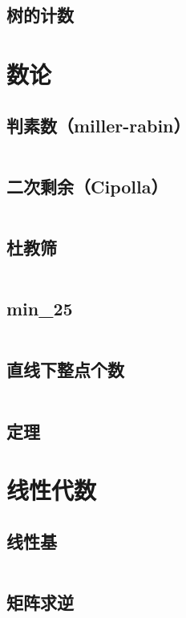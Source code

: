 \documentclass[a4paper,9]{article}
\begin{document}
\subsection{树的计数}


\section{数论}
\subsection{判素数（miller-rabin）}
\inputminted[breaklines]{c++}{number_theory/miller_rabin.cpp}
\subsection{二次剩余（Cipolla）}

\inputminted[breaklines]{c++}{number_theory/cipolla.cpp}
\subsection{杜教筛}
\inputminted[breaklines]{c++}{number_theory/dujiaoshai.cpp}
\subsection{min\_25}
\inputminted[breaklines]{c++}{number_theory/min25.cpp}
\subsection{直线下整点个数}
\inputminted[breaklines]{c++}{number_theory/lattice_count.cpp}
\subsection{定理}


\section{线性代数}
\subsection{线性基}
\inputminted[breaklines]{c++}{linear_algebra/lb.cpp}
\subsection{矩阵求逆}
\inputminted[breaklines]{c++}{linear_algebra/matrix_inversion.cpp}
\end{document}
